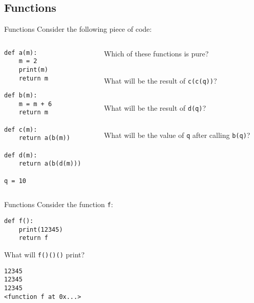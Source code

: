 \documentclass[9pt]{beamer}
\begin{document}
\subsection{Functions}
\begin{frame}[fragile]{Functions}
  Consider the following piece of code:
  \begin{columns}
    \begin{column}{0.5\textwidth}
      \begin{lstlisting}
def a(m):
    m = 2
    print(m)
    return m

def b(m):
    m = m + 6
    return m

def c(m):
    return a(b(m))

def d(m):
    return a(b(d(m)))

q = 10
    \end{lstlisting}
  \end{column}
  \begin{column}{0.5\textwidth}
    Which of these functions is pure? \\
     \\\vspace{1cm}

    What will be the result of {\tt c(c(q))}? \\
     \\\vspace{1cm}

    What will be the result of {\tt d(q)}? \\
     \\\vspace{1cm}

    What will be the value of {\tt q} after calling {\tt b(q)}? \\
  \end{column}
\end{columns}
\end{frame}

\begin{frame}[fragile]{Functions}
  Consider the function {\tt f}:
  \begin{lstlisting}
def f():
    print(12345)
    return f
  \end{lstlisting}

  What will {\tt f()()()} print?
  \pause
  \begin{lstlisting}[numbers=none, frame=none, xleftmargin=0pt]
12345
12345
12345
<function f at 0x...>
  \end{lstlisting}
\end{frame}
\end{document}
